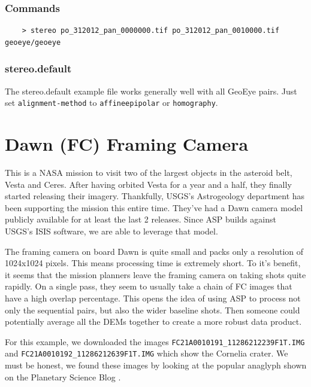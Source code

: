 \subsubsection*{Commands}

\begin{verbatim}
    > stereo po_312012_pan_0000000.tif po_312012_pan_0010000.tif geoeye/geoeye
\end{verbatim}

\subsubsection*{stereo.default}

The stereo.default example file works generally well with all GeoEye
pairs. Just set \texttt{alignment-method} to \texttt{affineepipolar}
or \texttt{homography}.

\newpage
\section{Dawn (FC) Framing Camera}

This is a NASA mission to visit two of the largest objects in the
asteroid belt, Vesta and Ceres. After having orbited Vesta for a year
and a half, they finally started releasing their imagery. Thankfully,
USGS's Astrogeology department has been supporting the mission this
entire time. They've had a Dawn camera model publicly available for at
least the last 2 releases. Since ASP builds against USGS's ISIS
software, we are able to leverage that model.

The framing camera on board Dawn is quite small and packs only a
resolution of 1024x1024 pixels. This means processing time is
extremely short. To it's benefit, it seems that the mission planners
leave the framing camera on taking shots quite rapidly. On a single
pass, they seem to usually take a chain of FC images that have a high
overlap percentage. This opens the idea of using ASP to process not
only the sequential pairs, but also the wider baseline shots. Then
someone could potentially average all the DEMs together to create a
more robust data product.

For this example, we downloaded the images
\texttt{FC21A0010191\_11286212239F1T.IMG} and
\texttt{FC21A0010192\_11286212639F1T.IMG} which show the Cornelia
crater. We must be honest, we found these images by looking at
the popular anaglyph shown on the Planetary Science
Blog \cite{planetaryblog:vesta}.

